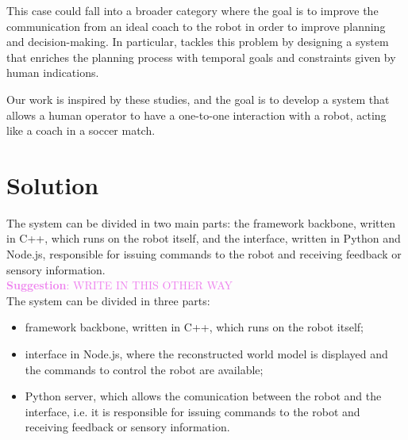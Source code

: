 \documentclass[a4paper, onecolumn, 12pt]{article}
\newcommand\suggestion[1]{\textcolor{violet}{\textbf{Suggestion}: #1}}
\begin{document}
This case could fall into a broader category where the goal is to improve the
communication from an ideal coach to the robot in order to improve planning and
decision-making. In particular, \cite{musumeci} tackles this problem by
designing a system that enriches the planning process with temporal goals and
constraints given by human indications. 

Our work is inspired by these studies, and the goal is to develop a system that
allows a human operator to have a one-to-one interaction with a robot, acting
like a coach in a soccer match.

\newpage
\section{Solution}
\label{sec:sol}

The system can be divided in two main parts: the framework backbone, written in
C++, which runs on the robot itself, and the interface, written in Python and
Node.js, responsible for issuing commands to the robot and receiving feedback or
sensory information. 
\\

\suggestion{WRITE IN THIS OTHER WAY}\\
The system can be divided in three parts: 
    \begin{itemize}
        \item framework backbone, written in C++, which runs on the robot itself;
        \item interface in Node.js, where the reconstructed world
        model is displayed and the commands to control the robot are available; 
        \item Python server, which allows the comunication between the robot 
        and the interface, i.e. it is responsible for issuing commands to the robot 
        and receiving feedback or sensory information. 
    \end{itemize}
\end{document}
